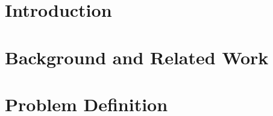 \documentclass[letterpaper,12pt,titlepage,oneside,final]{book}
\begin{document}
 

\chapter{Introduction}



\chapter{Background and Related Work}



\chapter{Problem Definition}

\end{document}
